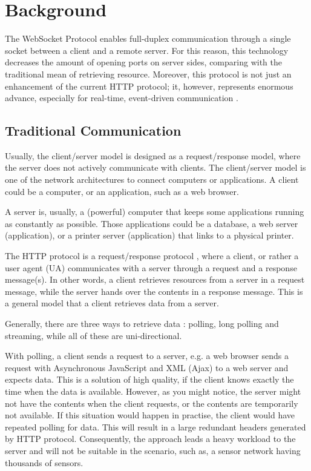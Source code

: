 \chapter{Background}
\label{chapter:background} 

The WebSocket Protocol enables full-duplex communication through a single socket between a client and a remote server. For this reason, this technology decreases the amount of opening ports on server sides, comparing with the traditional mean of retrieving resource. Moreover, this protocol is not just an enhancement of the current HTTP protocol; it, however, represents enormous advance, especially for real-time, event-driven communication \cite{lubbers2010html5}.

\section{Traditional Communication}

Usually, the client/server model is designed as a request/response model, where the server does not actively communicate with clients. The client/server model is one of the network architectures to connect computers or applications. A client could be a computer, or an application, such as a web browser. 

A server is, usually, a (powerful) computer that keeps some applications running as constantly as possible. Those applications could be a database, a web server (application), or a printer server (application) that links to a physical printer. 

The HTTP protocol is a request/response protocol \cite{fielding1999hypertext}, where a client, or rather a user agent (UA) communicates with a server through a request and a response message(s). In other words, a client retrieves resources from a server in a request message, while the server hands over the contents in a response message. This is a general model that a client retrieves data from a server. 

Generally, there are three ways to retrieve data \cite{lubbers2010html5}: polling, long polling and streaming, while all of these are uni-directional. 

With polling, a client sends a request to a server, e.g. a web browser sends a request with Asynchronous JavaScript and XML (Ajax) \cite{garrett2005ajax} to a web server and expects data. This is a solution of high quality, if the client knows exactly the time when the data is available. However, as you might notice, the server might not have the contents when the client requests, or the contents are temporarily not available. If this situation would happen in practise, the client would have repeated polling for data. This will result in a large redundant headers generated by HTTP protocol. Consequently, the approach leads a heavy workload to the server and will not be suitable in the scenario, such as, a sensor network having thousands of sensors. 

